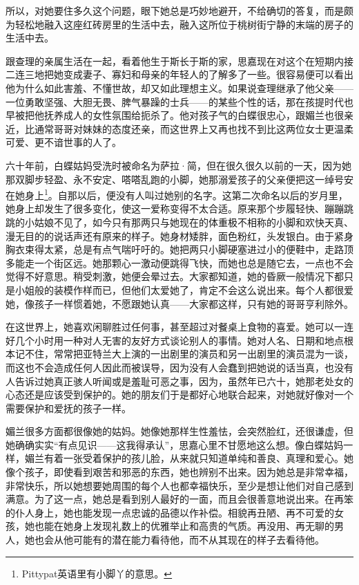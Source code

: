 \par 所以，对她要住多久这个问题，眼下她总是巧妙地避开，不给确切的答复，而是颇为轻松地融入这座红砖房里的生活中去，融入这所位于桃树街宁静的末端的房子的生活中去。
\par 跟查理的亲属生活在一起，看着他生于斯长于斯的家，思嘉现在对这个在短期内接二连三地把她变成妻子、寡妇和母亲的年轻人的了解多了一些。很容易便可以看出他为什么如此害羞、不懂世故，却又如此理想主义。如果说查理继承了他父亲——一位勇敢坚强、大胆无畏、脾气暴躁的士兵——的某些个性的话，那在孩提时代也早被把他抚养成人的女性氛围给扼杀了。他对孩子气的白蝶很忠心，跟媚兰也很亲近，比通常哥哥对妹妹的态度还亲，而这世界上又再也找不到比这两位女士更温柔可爱、更不谙世事的人了。
\par 六十年前，白蝶姑妈受洗时被命名为萨拉·简，但在很久很久以前的一天，因为她那双脚步轻盈、永不安定、嗒嗒乱跑的小脚，她那溺爱孩子的父亲便把这一绰号安在她身上\footnote{Pittypat英语里有小脚丫的意思。}。自那以后，便没有人叫过她别的名字。这第二次命名以后的岁月里，她身上却发生了很多变化，使这一爱称变得不太合适。原来那个步履轻快、蹦蹦跳跳的小姑娘不见了，如今只有那两只与她现在的体重极不相称的小脚和欢快天真、漫无目的的说话声还有原来的样子。她身材矮胖，面色粉红，头发银白。由于紧身胸衣束得太紧，总是有点气喘吁吁的。她把两只小脚硬塞进过小的便鞋中，走路顶多能走一个街区远。她那颗心一激动便跳得飞快，而她也总是随它去，一点也不会觉得不好意思。稍受刺激，她便会晕过去。大家都知道，她的昏厥一般情况下都只是小姐般的装模作样而已，但他们太爱她了，肯定不会这么说出来。每个人都很爱她，像孩子一样惯着她，不愿跟她认真——大家都这样，只有她的哥哥亨利除外。
\par 在这世界上，她喜欢闲聊胜过任何事，甚至超过对餐桌上食物的喜爱。她可以一连好几个小时用一种对人无害的友好方式谈论别人的事情。她对人名、日期和地点根本记不住，常常把亚特兰大上演的一出剧里的演员和另一出剧里的演员混为一谈，而这也不会造成任何人因此而被误导，因为没有人会蠢到把她说的话当真，也没有人告诉过她真正骇人听闻或是羞耻可恶之事，因为，虽然年已六十，她那老处女的心态还是应该受到保护的。她的朋友们于是都好心地联合起来，对她就好像对一个需要保护和爱抚的孩子一样。
\par 媚兰很多方面都很像她的姑妈。她像她那样生性羞怯，会突然脸红，还很谦虚，但她确确实实“有点见识——这我得承认”，思嘉心里不甘愿地这么想。像白蝶姑妈一样，媚兰有着一张受着保护的孩儿脸，从来就只知道单纯和善良、真理和爱心。她像个孩子，即使看到艰苦和邪恶的东西，她也辨别不出来。因为她总是非常幸福，非常快乐，所以她想要她周围的每个人也都幸福快乐，至少是想让他们对自己感到满意。为了这一点，她总是看到别人最好的一面，而且会很善意地说出来。在再笨的仆人身上，她也能发现一点忠诚的品德以作补偿。相貌再丑陋、再不可爱的女孩，她也能在她身上发现礼数上的优雅举止和高贵的气质。再没用、再无聊的男人，她也会从他可能有的潜在能力看待他，而不从其现在的样子去看待他。
